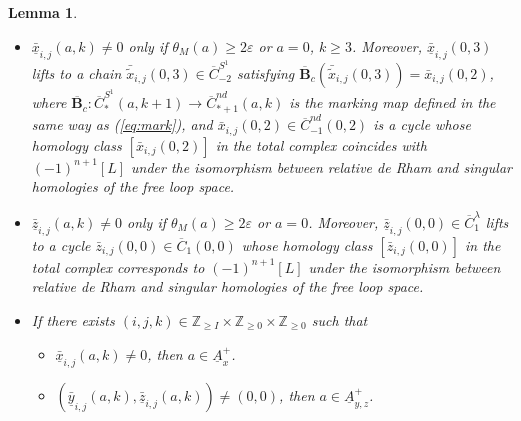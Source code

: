 \documentclass[a4paper]{article}
\newtheorem{lemma}[theorem]{Lemma}
\numberwithin{equation}{section}
\begin{document}
\begin{lemma}
\begin{itemize}
	\item[(vii)] $\bar{\underline{x}}_{i,j}(a,k)\neq0$ only if $\theta_M(a)\geq2\varepsilon$ or $a=0$, $k\geq3$. Moreover, $\bar{\underline{x}}_{i,j}(0,3)$ lifts to a chain $\bar{\tilde{x}}_{i,j}(0,3)\in\overline{C}^{S^1}_{-2}$ satisfying $\overline{\mathbf{B}}_c\left(\bar{\tilde{x}}_{i,j}(0,3)\right)=\bar{x}_{i,j}(0,2)$, where $\overline{\mathbf{B}}_c:\overline{C}_\ast^{S^1}(a,k+1)\rightarrow\overline{C}_{\ast+1}^{\mathit{nd}}(a,k)$ is the marking map defined in the same way as (\ref{eq:mark}), and $\bar{x}_{i,j}(0,2)\in\overline{C}_{-1}^\mathit{nd}(0,2)$ is a cycle whose homology class $\left[\bar{x}_{i,j}(0,2)\right]$ in the total complex coincides with $(-1)^{n+1}[L]$ under the isomorphism between relative de Rham and singular homologies of the free loop space.
	\item[(viii)] $\bar{\underline{z}}_{i,j}(a,k)\neq0$ only if $\theta_M(a)\geq2\varepsilon$ or $a=0$. Moreover, $\bar{\underline{z}}_{i,j}(0,0)\in\overline{C}_1^\lambda$ lifts to a cycle $\bar{z}_{i,j}(0,0)\in\overline{C}_1(0,0)$ whose homology class $\left[\bar{z}_{i,j}(0,0)\right]$ in the total complex corresponds to $(-1)^{n+1}[L]$ under the isomorphism between relative de Rham and singular homologies of the free loop space.
	\item[(ix)] If there exists $(i,j,k)\in\mathbb{Z}_{\geq I}\times\mathbb{Z}_{\geq0}\times\mathbb{Z}_{\geq0}$ such that 
	\begin{itemize}
		\item $\bar{\underline{x}}_{i,j}(a,k)\neq0$, then $a\in\underline{A}_x^+$.
		\item $\left(\bar{\underline{y}}_{i,j}(a,k),\bar{\underline{z}}_{i,j}(a,k)\right)\neq(0,0)$, then $a\in\underline{A}_{y,z}^+$.
	\end{itemize}
\end{itemize}
\end{lemma}
\end{document}
